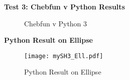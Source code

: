 \documentclass[12pt]{article}
\begin{document}
\textbf{Test 3: Chebfun v Python Results}
\begin{figure}[!tbp]
  \centering
  \hfill
  \caption{Chebfun v Python 3}
\end{figure}
\FloatBarrier

\textbf{Python Result on Ellipse}
\begin{figure}[ht]
        \centering
        \texttt{[image: mySH3\_Ell.pdf]}
        \label{fig:1}
        \caption{Python Result on Ellipse}
\end{figure}
\FloatBarrier
\end{document}
